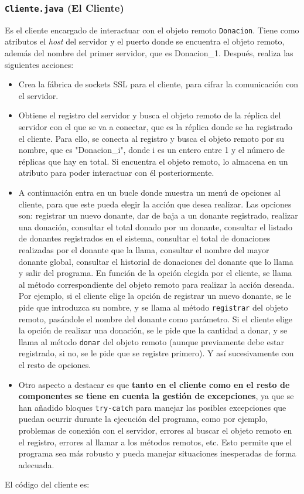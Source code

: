 \documentclass[a4paper,12pt]{article}
\begin{document}
			\subsubsection{\texttt{Cliente.java} (El Cliente)}
				Es el cliente encargado de interactuar con el objeto remoto \texttt{Donacion}. Tiene como atributos el \textit{host} del servidor y el puerto donde se encuentra el objeto remoto, además del nombre del primer servidor, que es Donacion\_1. Después, realiza las siguientes acciones:
				\begin{itemize}
					\item Crea la fábrica de sockets SSL para el cliente, para cifrar la comunicación con el servidor.
					\item Obtiene el registro del servidor y busca el objeto remoto de la réplica del servidor con el que se va a conectar, que es la réplica donde se ha registrado el cliente. Para ello, se conecta al registro y busca el objeto remoto por su nombre, que es "Donacion\_i", donde i es un entero entre 1 y el número de réplicas que hay en total. Si encuentra el objeto remoto, lo almacena en un atributo para poder interactuar con él posteriormente.
					\item A continuación entra en un bucle donde muestra un menú de opciones al cliente, para que este pueda elegir la acción que desea realizar. Las opciones son: registrar un nuevo donante, dar de baja a un donante registrado, realizar una donación, consultar el total donado por un donante, consultar el listado de donantes registrados en el sistema, consultar el total de donaciones realizadas por el donante que la llama, consultar el nombre del mayor donante global, consultar el historial de donaciones del donante que lo llama y salir del programa. En función de la opción elegida por el cliente, se llama al método correspondiente del objeto remoto para realizar la acción deseada. Por ejemplo, si el cliente elige la opción de registrar un nuevo donante, se le pide que introduzca su nombre, y se llama al método \texttt{registrar} del objeto remoto, pasándole el nombre del donante como parámetro. Si el cliente elige la opción de realizar una donación, se le pide que la cantidad a donar, y se llama al método \texttt{donar} del objeto remoto (aunque previamente debe estar registrado, si no, se le pide que se registre primero). Y así sucesivamente con el resto de opciones.
					\item Otro aspecto a destacar es que \textbf{tanto en el cliente como en el resto de componentes se tiene en cuenta la gestión de excepciones}, ya que se han añadido bloques \texttt{try-catch} para manejar las posibles excepciones que puedan ocurrir durante la ejecución del programa, como por ejemplo, problemas de conexión con el servidor, errores al buscar el objeto remoto en el registro, errores al llamar a los métodos remotos, etc. Esto permite que el programa sea más robusto y pueda manejar situaciones inesperadas de forma adecuada.
				\end{itemize}
				El código del cliente es:
				\inputminted[linenos, frame=lines, fontsize=\scriptsize]{Java}{../codigo/Parte_2_Servidor_Replicado/Cliente.java}		
				
\end{document}
